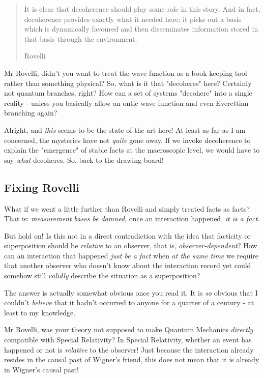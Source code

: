 \documentclass{article}
\begin{document}
\blockquote[Rovelli]{
It is clear that decoherence should play some role in this story. And in fact, decoherence provides exactly what it needed here: it picks out a basis which is dynamically favoured and then disseminates information stored in that basis through the environment.
}

Mr Rovelli, didn't you want to treat the wave function as a book keeping tool rather than something physical? So, what is it that "decoheres" here? Certainly not quantum branches, right? How can a set of systems "decohere" into a single reality - unless you basically allow an ontic wave function and even Everettian branching again?

Alright, and \textit{this} seems to be the state of the art here! At least as far as I am concerned, the mysteries have not \textit{quite} gone away. If we invoke decoherence to explain the "emergence" of stable facts at the macroscopic level, we would have to say \textit{what} decoheres. So, back to the drawing board!

\subsection{Fixing Rovelli}

What if we went a little further than Rovelli and simply treated facts as facts? That is: \textit{measurement bases be damned}, once an interaction happened, \textit{it is a fact}.

But hold on! Is this not in a direct contradiction with the idea that facticity or superposition should be \textit{relative} to an observer, that is, \textit{observer-dependent}? How can an interaction that happened \textit{just be a fact} when \textit{at the same time} we require that another observer who doesn't know about the interaction record yet could somehow still \textit{validly} describe the situation as a superposition?

The answer is actually somewhat obvious once you read it. It is \textit{so} obvious that I couldn't \textit{believe} that it hadn't occurred to anyone for a quarter of a century - at least to my knowledge.

Mr Rovelli, was your theory not supposed to make Quantum Mechanics \textit{directly} compatible with Special Relativity? In Special Relativity, whether an event has happened or not is \textit{relative} to the observer! Just because the interaction already resides in the causal past of Wigner's friend, this does not mean that it is already in Wigner's causal past!
\end{document}
